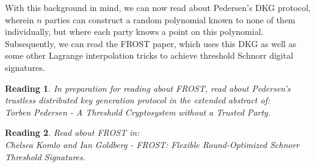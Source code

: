 \documentclass[12pt]{article}
\newtheorem{reading}{Reading}
\theoremstyle{definition}
\theoremstyle{remark}
\theoremstyle{definition}
\begin{document}
With this background in mind, we can now read about Pedersen's DKG protocol, wherein $n$ parties can construct a random polynomial known to none of them individually, but where each party knows a point on this polynomial. Subsequently, we can read the FROST paper, which uses this DKG as well as some other Lagrange interpolation tricks to achieve threshold Schnorr digital signatures.

\begin{reading}
In preparation for reading about FROST, read about Pedersen's trustless distributed key generation protocol in the extended abstract of:\\
Torben Pedersen - A Threshold Cryptosystem without a Trusted Party.
\end{reading}

\begin{reading}
Read about FROST in:\\
Chelsea Komlo and Ian Goldberg - FROST: Flexible Round-Optimized Schnorr Threshold Signatures.
\end{reading}
\end{document}
